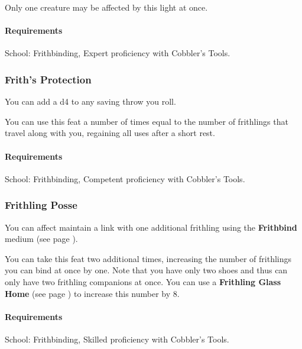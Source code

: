     Only one creature may be affected by this light at once.
    \paragraph{Requirements} School: Frithbinding, Expert proficiency with Cobbler's Tools.
\subsubsection{Frith's Protection} \label{feat::frithsprotection}
    You can add a d4 to any saving throw you roll.

    You can use this feat a number of times equal to the number of frithlings that travel along with you, regaining all uses after a short rest.
    \paragraph{Requirements} School: Frithbinding, Competent proficiency with Cobbler's Tools.
\subsubsection{Frithling Posse} \label{feat::frithlingposse}
    You can affect maintain a link with one additional frithling using the \textbf{Frithbind} medium (see page \pageref{medium::frithbind}).

    You can take this feat two additional times, increasing the number of frithlings you can bind at once by one.
    Note that you have only two shoes and thus can only have two frithling companions at once.
    You can use a \textbf{Frithling Glass Home} (see page \pageref{item::frithlingglasshome}) to increase this number by 8.
    \paragraph{Requirements} School: Frithbinding, Skilled proficiency with Cobbler's Tools.
